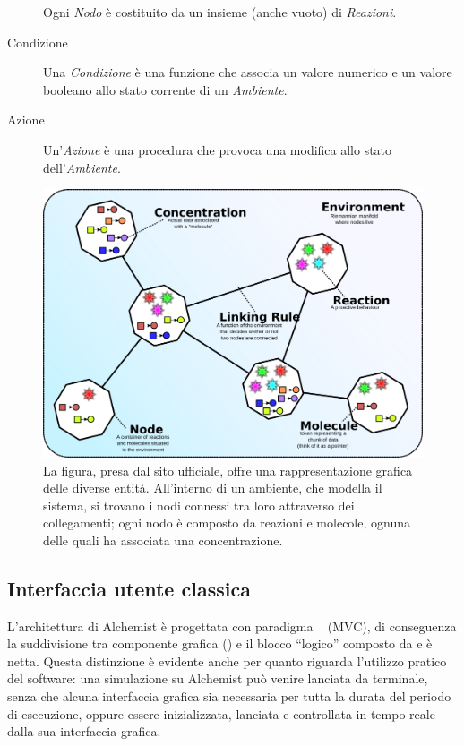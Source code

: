\begin{description}
                    Ogni \emph{Nodo} è costituito da un insieme (anche vuoto) di \emph{Reazioni}.

                \item[Condizione]\label{itm:cond}
                    Una \emph{Condizione} è una funzione che associa un valore numerico e un valore booleano allo stato corrente di un \emph{Ambiente}.

                \item[Azione]\label{itm:act}
                    Un'\emph{Azione} è una procedura che provoca una modifica allo stato dell'\emph{Ambiente}.

            \end{description}

            \begin{figure}[htbp]
                \centering
                \includegraphics[scale=.4]{img/model}
                \caption{%
                    La figura, presa dal sito ufficiale, offre una rappresentazione grafica delle diverse entità. All’interno di un ambiente, che modella il sistema, si trovano i nodi connessi tra loro attraverso dei collegamenti; ogni nodo è composto da reazioni e molecole, ognuna delle quali ha associata una concentrazione.
                }
                \label{fig:model}
            \end{figure}

        \subsection{Interfaccia utente classica}\label{sub:prevGui}
            L'architettura di Alchemist è progettata con paradigma ~\cite{mvc} (MVC), di conseguenza la suddivisione tra componente grafica () e il blocco ``logico'' composto da  e  è netta.
            Questa distinzione è evidente anche per quanto riguarda l'utilizzo pratico del software: una simulazione su Alchemist può venire lanciata da terminale, senza che alcuna interfaccia grafica sia necessaria per tutta la durata del periodo di esecuzione, oppure essere inizializzata, lanciata e controllata in tempo reale dalla sua interfaccia grafica.


